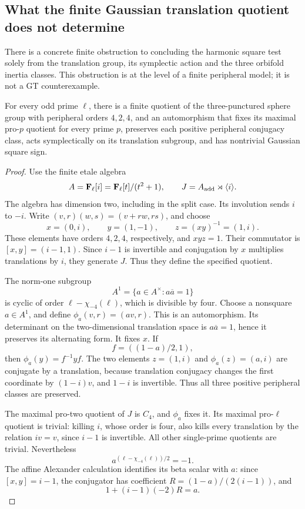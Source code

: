 \subsection{What the finite Gaussian translation quotient does not determine}

There is a concrete finite obstruction to concluding the harmonic
square test solely from the translation group, its symplectic
action and the three orbifold inertia classes. This obstruction
is at the level of a finite peripheral model; it is not a GT
counterexample.

\begin{proposition}\label{prop:gaussian-finite-peripheral-scope}
For every odd prime \(\ell\), there is a finite quotient of the
three-punctured sphere group with peripheral orders \(4,2,4\),
and an automorphism that fixes its maximal pro-\(p\) quotient
for every prime \(p\), preserves each positive peripheral
conjugacy class, acts symplectically on its translation subgroup,
and has nontrivial Gaussian square sign.
\end{proposition}
\begin{proof}
Use the finite etale algebra
\[
 A=\mathbf F_\ell[i]=\mathbf F_\ell[t]/(t^2+1),\qquad
 J=A_{\rm add}\rtimes\langle i\rangle.
\]
The algebra has dimension two, including in the split case.
Its involution sends \(i\) to \(-i\). Write
\((v,r)(w,s)=(v+rw,rs)\), and choose
\[
 x=(0,i),\qquad y=(1,-1),\qquad z=(xy)^{-1}=(1,i).
\]
These elements have orders \(4,2,4\), respectively, and \(xyz=1\).
Their commutator is \([x,y]=(i-1,1)\).
Since \(i-1\) is invertible and conjugation by \(x\) multiplies
translations by \(i\), they generate \(J\).
Thus they define the specified quotient.

The norm-one subgroup
\[
 A^1=\{a\in A^\times:a\overline a=1\}
\]
is cyclic of order \(\ell-\chi_{-4}(\ell)\), which is divisible
by four. Choose a nonsquare \(a\in A^1\), and define
\(\phi_a(v,r)=(av,r)\). This is an automorphism.
Its determinant on the two-dimensional translation space is
\(a\overline a=1\), hence it preserves its alternating form.
It fixes \(x\). If
\[
 f=((1-a)/2,1),
\]
then \(\phi_a(y)=f^{-1}yf\). The two elements \(z=(1,i)\)
and \(\phi_a(z)=(a,i)\) are conjugate by a translation, because
translation conjugacy changes the first coordinate by
\((1-i)v\), and \(1-i\) is invertible.
Thus all three positive peripheral classes are preserved.

The maximal pro-two quotient of \(J\) is \(C_4\), and
\(\phi_a\) fixes it. Its maximal pro-\(\ell\) quotient is
trivial: killing \(i\), whose order is four, also kills every
translation by the relation \(iv=v\), since \(i-1\) is invertible.
All other single-prime quotients are trivial. Nevertheless
\[
             a^{(\ell-\chi_{-4}(\ell))/2}=-1.
\]
The affine Alexander calculation identifies its beta scalar
with \(a\): since \([x,y]=i-1\), the conjugator has coefficient
\(R=(1-a)/(2(i-1))\), and
\[
             1+(i-1)(-2)R=a.
\]
\end{proof}

